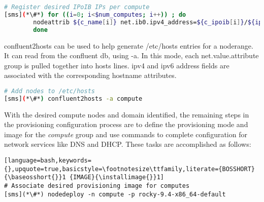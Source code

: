 \begin{lstlisting}[language=bash,keywords={},upquote=true,basicstyle=\footnotesize\ttfamily]
# Register desired IPoIB IPs per compute
[sms](*\#*) for ((i=0; i<$num_computes; i++)) ; do
		nodeattrib ${c_name[i]} net.ib0.ipv4_address=${c_ipoib[i]}/${ipoib_netmask}
        done
\end{lstlisting}

confluent2hosts can be used to help generate /etc/hosts entries for a noderange.
It can read from the confluent db, using -a. In this mode, each net.value.attribute
group is pulled together into hosts lines. ipv4 and ipv6 address
fields are associated with the corresponding hostname attributes.

\begin{lstlisting}[language=bash,keywords={},upquote=true,basicstyle=\footnotesize\ttfamily]
# Add nodes to /etc/hosts
[sms](*\#*) confluent2hosts -a compute
\end{lstlisting}

With the desired compute nodes and domain identified, the remaining steps in the
provisioning configuration process are to define the provisioning mode and
image for the {\em compute} group and use \Confluent{} commands to complete
configuration for network services like DNS and DHCP. These tasks are
accomplished as follows:

\begin{lstlisting}[language=bash,keywords={},upquote=true,basicstyle=\footnotesize\ttfamily,literate={BOSSHORT}{\baseosshort{}}1 {IMAGE}{\installimage{}}1]
# Associate desired provisioning image for computes
[sms](*\#*) nodedeploy -n compute -p rocky-9.4-x86_64-default
\end{lstlisting}

